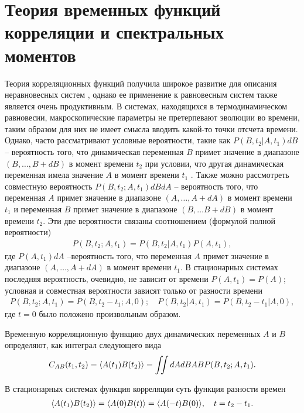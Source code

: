 \section{Теория временных функций корреляции и спектральных моментов} \label{section:correlation_functions}

Теория корреляционных функций получила широкое развитие для описания неравновесных систем \cite{zwanzig1965}, однако ее применение к равновесным систем также является очень продуктивным. В системах, находящихся в термодинамическом равновесии, макроскопические параметры не претерпевают эволюции во времени, таким образом для них не имеет смысла вводить какой-то точки отсчета времени. Однако, часто рассматривают условные вероятности, такие как $P(B, t_2 \vert A, t_1) dB$ -- вероятность того, что динамическая переменная $B$ примет значение в диапазоне $(B, \dots, B + dB)$ в момент времени $t_2$ при условии, что другая динамическая переменная имела значение $A$ в момент времени $t_1$ \cite{nitzan2006}. Также можно рассмотреть совместную вероятность $P(B, t_2; A, t_1) dB dA$ -- вероятность того, что переменная $A$ примет значение в диапазоне $(A, \dots, A+dA)$ в момент времени $t_1$ и переменная $B$ примет значение в диапазоне $(B, \dots B+dB)$ в момент времени $t_2$. Эти две вероятности связаны соотношением (формулой полной вероятности)
\begin{gather}
    P(B, t_2; A, t_1) = P(B, t_2 \vert A, t_1) P(A, t_1), 
\end{gather}
где $P(A, t_1) dA$ --вероятность того, что переменная $A$ примет значение в диапазоне $(A, \dots, A+dA)$ в момент времени $t_1$. В стационарных системах последняя вероятность, очевидно, не зависит от времени $P(A, t_1) = P(A)$; условная и совместная вероятности зависят только от разности времени
\begin{gather}
    P(B, t_2; A, t_1) = P(B, t_2 - t_1; A, 0); \quad P(B, t_2 \vert A, t_1) = P(B, t_2 - t_1 \vert A, 0),
\end{gather}
%
где $t = 0$ было положено произвольным образом.\par
Временную корреляционную функцию двух динамических переменных $A$ и $B$ определяют, как интеграл следующего вида 
\begin{gather}
    C_{AB}(t_1, t_2) = \langle  A(t_1) B(t_2)  \rangle = \iint dA dB AB P(B, t_2; A, t_1). \label{part1-correlation-function-definition}
\end{gather}

В стационарных системах функция корреляции суть функция разности времен
\begin{gather}
    \langle  A(t_1) B(t_2)  \rangle = \langle  A(0) B(t)  \rangle = \langle  A(-t) B(0)  \rangle, \quad t = t_2 - t_1.
\end{gather}

